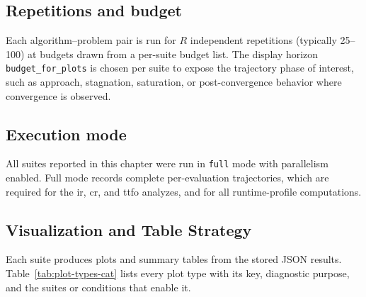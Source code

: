 \subsection{Repetitions and budget}
Each algorithm--problem pair is run for $R$ independent repetitions
(typically 25--100) at budgets drawn from a per-suite budget list. The
display horizon \texttt{budget\_for\_plots} is chosen per suite to expose the
trajectory phase of interest, such as approach, stagnation, saturation, or
post-convergence behavior where convergence is observed.

\subsection{Execution mode}
All suites reported in this chapter were run in \texttt{full} mode with
parallelism enabled. Full mode records complete per-evaluation trajectories,
which are required for the \acrshort{ir}, \acrshort{cr}, and
\acrshort{ttfo} analyzes, and for all runtime-profile computations.

\subsection{Visualization and Table Strategy}
\label{subsec:exper:vis}

Each suite produces plots and summary tables from the stored JSON results.
Table~\ref{tab:plot-types-cat} lists every plot type with its key, diagnostic
purpose, and the suites or conditions that enable it.

